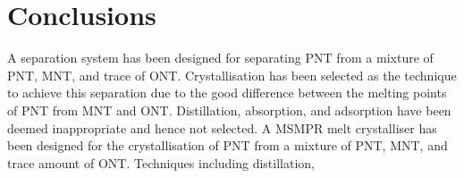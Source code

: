 \section{Conclusions}\label{separation conclusions}

A separation system has been designed for separating PNT from a mixture of PNT, MNT, and trace of ONT. Crystallisation has been selected as the technique to achieve this separation due to the good difference between the melting points of PNT from MNT and ONT. Distillation, absorption, and adsorption have been deemed inappropriate and hence not selected. A MSMPR melt crystalliser has been designed for the crystallisation of PNT from a mixture of PNT, MNT, and trace amount of ONT. Techniques including distillation, 